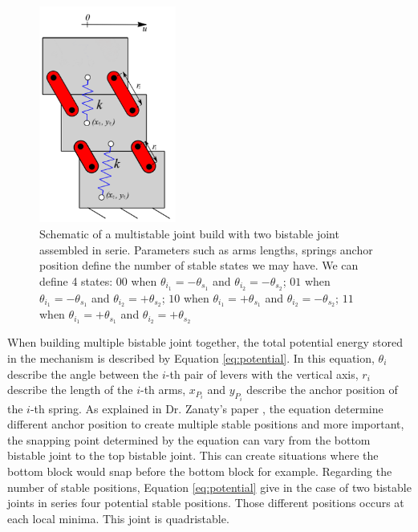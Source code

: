         \begin{figure}
        \centering
        \includegraphics[width=0.40\textwidth]{images/multistable.png}
        \caption{Schematic of a multistable joint build with two bistable joint assembled in serie. Parameters such as arms lengths, springs anchor position define the number of stable states we may have. We can define 4 states: $00$ when $\theta_{i_1} = -\theta_{s_1}$ and $\theta_{i_2} = -\theta_{s_2}$; $01$ when $\theta_{i_1} = -\theta_{s_1}$ and $\theta_{i_2} = +\theta_{s_2}$; $10$ when $\theta_{i_1} = +\theta_{s_1}$ and $\theta_{i_2} = -\theta_{s_2}$; $11$ when $\theta_{i_1} = +\theta_{s_1}$ and $\theta_{i_2} = +\theta_{s_2}$}
        \label{fig:joint_multistable}
        \end{figure}
        
        When building multiple bistable joint together, the total potential energy stored in the mechanism is described by Equation \ref{eq:potential}. In this equation, $\theta_i$ describe the angle between the $i$-th pair of levers with the vertical axis, $r_i$ describe the length of the $i$-th arms, $x_{P_i}$ and $y_{P_i}$ describe the anchor position of the $i$-th spring. As explained in Dr. Zanaty's paper \cite{mo_main_paper}, the equation determine different anchor position to create multiple stable positions and more important, the snapping point determined by the equation can vary from the bottom bistable joint to the top bistable joint. This can create situations where the bottom block would snap before the bottom block for example. Regarding the number of stable positions, Equation \ref{eq:potential} give in the case of two bistable joints in series four potential stable positions. Those different positions occurs at each local minima. This joint is quadristable.

